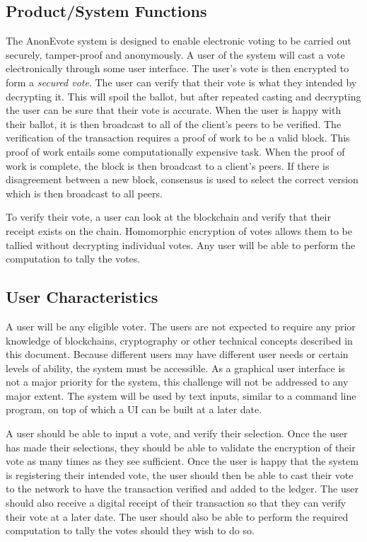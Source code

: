 \documentclass[a4paper,12pt]{article}
\newcommand{\proj}{AnonEvote}
\begin{document}
\subsection{Product/System Functions}
The \proj{} system is designed to enable electronic voting to be carried out securely, tamper-proof and anonymously. A user of the system will cast a vote electronically through some user interface. The user's vote is then encrypted to form a \textit{secured vote}. The user can verify that their vote is what they intended by decrypting it. This will spoil the ballot, but after repeated casting and decrypting the user can be sure that their vote is accurate. When the user is happy with their ballot, it is then broadcast to all of the client's peers to be verified. The verification of the transaction requires a proof of work to be a valid block. This proof of work entails some computationally expensive task. When the proof of work is complete, the block is then broadcast to a client's peers. If there is disagreement between a new block, consensus is used to select the correct version which is then broadcast to all peers.

To verify their vote, a user can look at the blockchain and verify that their receipt exists on the chain. Homomorphic encryption of votes allows them to be tallied without decrypting individual votes. Any user will be able to perform the computation to tally the votes.

\subsection{User Characteristics}
A user will be any eligible voter. The users are not expected to require any prior knowledge of blockchains, cryptography or other technical concepts described in this document. Because different users may have different user needs or certain levels of ability, the system must be accessible. As a graphical user interface is not a major priority for the system, this challenge will not be addressed to any major extent. The system will be used by text inputs, similar to a command line program, on top of which a UI can be built at a later date.

A user should be able to input a vote, and verify their selection. Once the user has made their selections, they should be able to validate the encryption of their vote as many times as they see sufficient. Once the user is happy that the system is registering their intended vote, the user should then be able to cast their vote to the network to have the transaction verified and added to the ledger. The user should also receive a digital receipt of their transaction so that they can verify their vote at a later date. The user should also be able to perform the required computation to tally the votes should they wish to do so.
\end{document}
